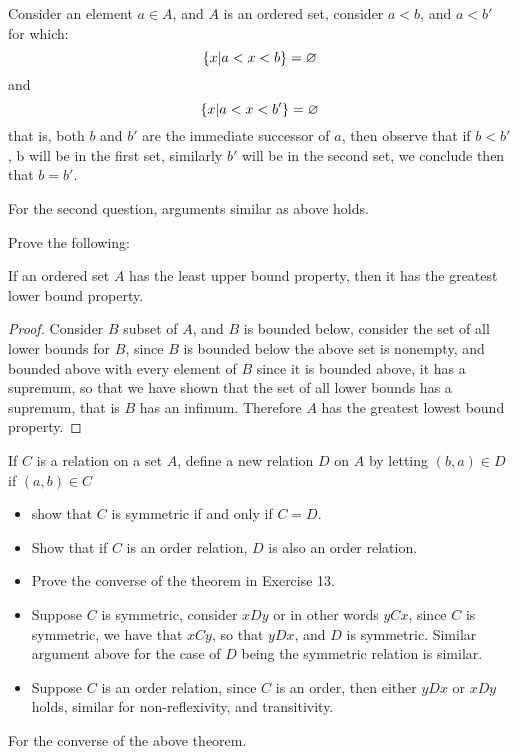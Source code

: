 \begin{sol}
	Consider an element $ a  \in A$, and $ A $ is an ordered set, consider $ a < b $, and $ a < b' $ for which:
	\[ \left\lbrace x | a <x < b \right\rbrace = \varnothing \]
	and
	\[ \left\lbrace x | a < x < b' \right\rbrace = \varnothing \]
	that is, both $ b $ and $ b' $ are the immediate successor of $ a $, then observe that if $ b < b' $, b will be in the first set, similarly $ b' $ will be in the second set, we conclude then that $ b = b' $.
	
	For the second question, arguments similar as above holds. 
\end{sol}
\begin{exc}
	Prove the following:
	\begin{thm}
		If an ordered set $ A $ has the least upper bound property, then it has the greatest lower bound property.
	\end{thm}
\end{exc}
\begin{sol}
	\begin{proof}
		Consider $ B $ subset of $ A $, and $ B $ is bounded below, consider the set of all lower bounds for $ B $, since $ B  $ is bounded below the above set is nonempty, and bounded above with every element of $ B $ since it is bounded above, it has a supremum, so that we have shown that the set of all lower bounds has a supremum, that is $ B $ has an infimum. Therefore $ A $ has the greatest lowest bound property.
	\end{proof}
	
\end{sol}

\begin{exc}
	If $ C $ is a relation on a set $ A $, define a new relation $ D $ on $ A $ by letting $ (b,a) \in D $ if $ (a,b) \in C $
	\begin{itemize}
		\item show that $ C $ is symmetric if and only if $ C = D $.
		\item Show that if $ C $ is an order relation, $ D $ is also an order relation.
		\item Prove the converse of the theorem in Exercise 13.
	\end{itemize}
\end{exc}
\begin{sol}
	\begin{itemize}
		\item Suppose $ C $ is symmetric, consider $ xDy $ or in other words $ yCx $, since $ C $ is symmetric, we have that $ xCy $, so that $ yDx $, and $ D $ is symmetric. Similar argument above for the case of $ D $ being the symmetric relation is similar.
		\item Suppose $ C $ is an order relation, since $ C $ is an order, then either $ yDx $ or $ xDy $ holds, similar for non-reflexivity, and transitivity.
	\end{itemize}
	For the converse of the above theorem.
	
\end{sol}


